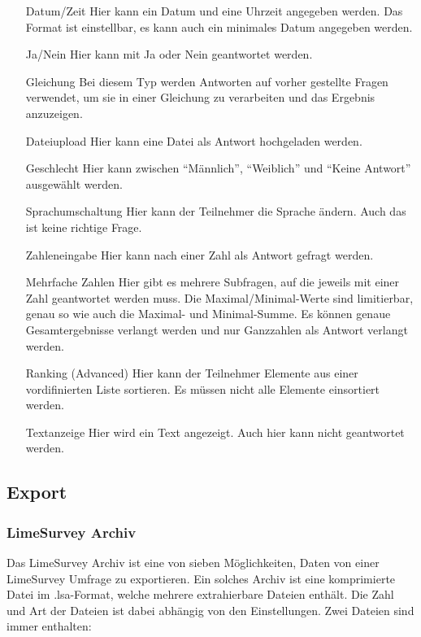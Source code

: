\begin{itemize}
	\item[Datum/Zeit] Hier kann ein Datum und eine Uhrzeit angegeben werden. Das Format ist einstellbar, es kann auch ein minimales Datum angegeben werden.
	\item[Ja/Nein] Hier kann mit Ja oder Nein geantwortet werden.
	\item[Gleichung] Bei diesem Typ werden Antworten auf vorher gestellte Fragen verwendet, um sie in einer Gleichung zu verarbeiten und das Ergebnis anzuzeigen.
	\item[Dateiupload] Hier kann eine Datei als Antwort hochgeladen werden.
	\item[Geschlecht] Hier kann zwischen \enquote{Männlich}, \enquote{Weiblich} und \enquote{Keine Antwort} ausgewählt werden.
	\item[Sprachumschaltung] Hier kann der Teilnehmer die Sprache ändern. Auch das ist keine richtige Frage.
	\item[Zahleneingabe] Hier kann nach einer Zahl als Antwort gefragt werden.
	\item[Mehrfache Zahlen] Hier gibt es mehrere Subfragen, auf die jeweils mit einer Zahl geantwortet werden muss. Die Maximal/Minimal-Werte sind limitierbar, genau so wie auch die Maximal- und Minimal-Summe. Es können genaue Gesamtergebnisse verlangt werden und nur Ganzzahlen als Antwort verlangt werden.
	\item[Ranking (Advanced)] Hier kann der Teilnehmer Elemente aus einer vordifinierten Liste sortieren. Es müssen nicht alle Elemente einsortiert werden.
	\item[Textanzeige] Hier wird ein Text angezeigt. Auch hier kann nicht geantwortet werden.
\end{itemize}

\subsection{Export}
\subsubsection{LimeSurvey Archiv}
\label{m:lsa}
Das LimeSurvey Archiv ist eine von sieben Möglichkeiten, Daten von einer LimeSurvey Umfrage zu exportieren.
Ein solches Archiv ist eine komprimierte Datei im .lsa-Format, welche mehrere extrahierbare Dateien enthält.
Die Zahl und Art der Dateien ist dabei abhängig von den Einstellungen. Zwei Dateien sind immer enthalten:

